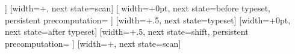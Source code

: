 {{        \let\pgfdecorationrestoftext=\pgfdecorationtext%
    }]{}%
[width=+\pgf@lib@dec@text@indent@left, next state=scan]{}%
[
    width=+0pt,
    next state=before typeset,
    persistent precomputation={
        \pgf@lib@dec@text@scanchar%
        \ifvoid\pgf@lib@dec@text@box%
            \setbox\pgf@lib@dec@text@box\hbox{}%
            \wd{}\relax%
        \fi%
}]{}%
[width=+.5\wd\pgf@lib@dec@text@box, next state=typeset]{}%
[width=+0pt, next state=after typeset]
{%
  \pgftransformxshift{+-.5\wd\pgf@lib@dec@text@box}%
  \setbox\pgf@hbox\hbox{\copy\pgf@lib@dec@text@box}%
  \pgfqboxsynced\pgf@hbox%
}%
[width=+.5\wd\pgf@lib@dec@text@box, next state=shift,
    persistent precomputation={%
    \ifpgf@lib@dec@text@fit%
        \ifpgf@lib@dec@text@stretch@spaces%
            \ifpgf@lib@dec@text@scan@space%
                \let\pgf@lib@dec@text@shift=\pgf@lib@dec@text@space@shift%
            \else%
                \def\pgf@lib@dec@text@shift{0pt}%
            \fi%
        \else%
            \let\pgf@lib@dec@text@shift=\pgf@lib@dec@text@character@shift%
          \fi%
        \else%
            \def\pgf@lib@dec@text@shift{0pt}%
      \fi%
  }]{}%
[width=+\pgf@lib@dec@text@shift, next state=scan]{}%
%
}%


\def\pgfsetdecoratetextformatdelimiters#1#2{%
    \def\pgf@lib@dec@text@formatchar{#1}%
    \def\pgf@test{#2}%
    \ifx\pgf@test\pgfutil@empty%
        \def\pgf@lib@dec@text@collectformat##1#1{%
        \pgf@lib@dec@text@@collectformat##1\pgf@stop}%
    \else%
        \def\pgf@lib@dec@text@collectformat##1#2{%
            \pgf@lib@dec@text@@collectformat##1\pgf@stop}%
    \fi%
}%

\pgfsetdecoratetextformatdelimiters{|}{}%

\newbox\pgf@lib@dec@text@box
\newif\ifpgf@lib@decorate@textmathmode

\let\pgfdecorationtext=\pgfutil@empty
\let\pgfdecorationrestoftext=\pgfutil@empty%
\let\pgf@lib@dec@text@format=\pgfutil@empty

\def\pgf@lib@dec@text@scanchar{%
    \pgf@lib@dec@text@scan@spacefalse%
    \ifx\pgfdecorationrestoftext\pgfutil@empty%
        \let\pgf@lib@dec@text@char\pgfutil@empty%
        \setbox\pgf@lib@dec@text@box\box\pgfutil@voidb@x%
        \let\pgf@next\relax%
    \else\ifx\pgfdecorationrestoftext\pgf@lib@dec@mathshift%
        \ifpgf@lib@decorate@textmathmode%
          \pgf@lib@decorate@textmathmodefalse%
        \fi%
        \let\pgf@lib@dec@text@char\pgfutil@empty%
        \setbox\pgf@lib@dec@text@box\box\pgfutil@voidb@x%
        \let\pgf@next\relax%
    \else
        \let\pgf@next\pgf@lib@dec@text@@scanchar%
    \fi\fi%
    \pgf@next}%

